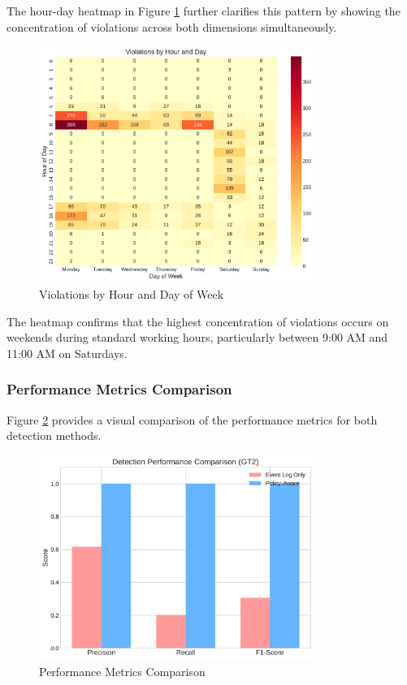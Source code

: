 The hour-day heatmap in Figure \ref{fig:hour-day-heatmap} further clarifies this pattern by showing the concentration of violations across both dimensions simultaneously.

\begin{figure}[h]
\centering
\includegraphics[width=0.8\textwidth]{paper_sections/violations_hour_day_heatmap.pdf}
\caption{Violations by Hour and Day of Week}
\label{fig:hour-day-heatmap}
\end{figure}

The heatmap confirms that the highest concentration of violations occurs on weekends during standard working hours, particularly between 9:00 AM and 11:00 AM on Saturdays.

\subsubsection{Performance Metrics Comparison}

Figure \ref{fig:performance-metrics} provides a visual comparison of the performance metrics for both detection methods.

\begin{figure}[h]
\centering
\includegraphics[width=0.8\textwidth]{paper_sections/performance_metrics_comparison.pdf}
\caption{Performance Metrics Comparison}
\label{fig:performance-metrics}
\end{figure}

